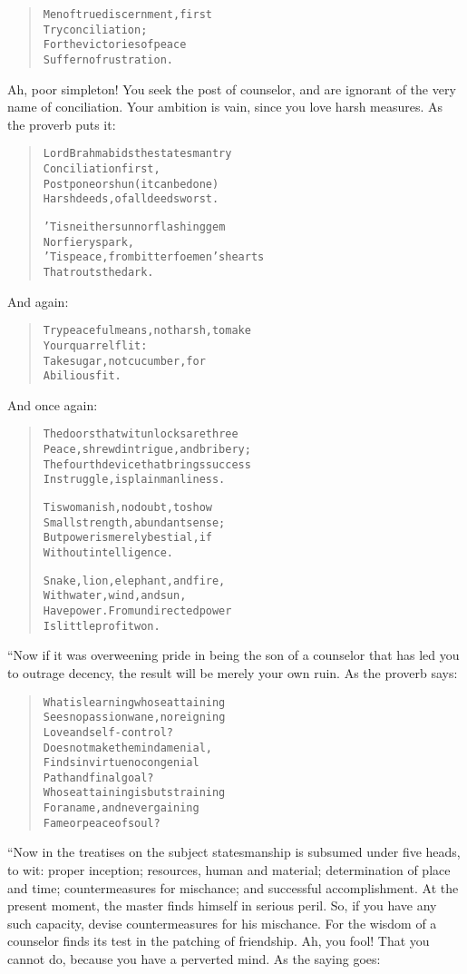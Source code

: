 \documentclass[article, twoside, 14pt]{memoir}
\renewenvironment{verbatim}{%
\begin{quote}%
\vskip -10pt%
\begin{alltt}\normalfont\large}{\end{alltt}%
\end{quote}%
\vskip -10pt
} %
\begin{document}
\begin{verbatim}
Men of true discernment, first
    Try conciliation;
For the victories of peace
    Suffer no frustration.
\end{verbatim}
Ah, poor simpleton! You seek the post of counselor, and are
ignorant of the very name of conciliation. Your ambition is vain,
since you love harsh measures. As the proverb puts it:

\begin{verbatim}
Lord Brahma bids the statesman try
    Conciliation first,
Postpone or shun (it can be done)
    Harsh deeds, of all deeds worst.

'Tis neither sun nor flashing gem
    Nor fiery spark,
'Tis peace, from bitter foemen's hearts
    That routs the dark.
\end{verbatim}
And again:

\begin{verbatim}
Try peaceful means, not harsh, to make
    Your quarrel flit:
Take sugar, not cucumber, for
    A bilious fit.
\end{verbatim}
And once again:

\begin{verbatim}
The doors that wit unlocks are three{\textemdash}
Peace, shrewd intrigue, and bribery;
The fourth device that brings success
In struggle, is plain manliness.

Tis womanish, no doubt, to show
    Small strength, abundant sense;
But power is merely bestial, if
    Without intelligence.

Snake, lion, elephant, and fire,
    With water, wind, and sun,
Have power. From undirected power
    Is little profit won.
\end{verbatim}
“Now if it was overweening pride in being the son of a counselor
that has led you to outrage decency, the result will be merely your
own ruin. As the proverb says:

\begin{verbatim}
What is learning whose attaining
Sees no passion wane, no reigning
    Love and self-control?
Does not make the mind a menial,
Finds in virtue no congenial
    Path and final goal?
Whose attaining is but straining
For a name, and never gaining
    Fame or peace of soul?
\end{verbatim}
“Now in the treatises on the subject statesmanship is subsumed
under five heads, to wit: proper inception; resources, human and
material; determination of place and time; countermeasures for
mischance; and successful accomplishment. At the present moment,
the master finds himself in serious peril. So, if you have any such
capacity, devise countermeasures for his mischance. For the wisdom
of a counselor finds its test in the patching of friendship. Ah,
you fool! That you cannot do, because you have a perverted mind. As
the saying goes:
\end{document}
